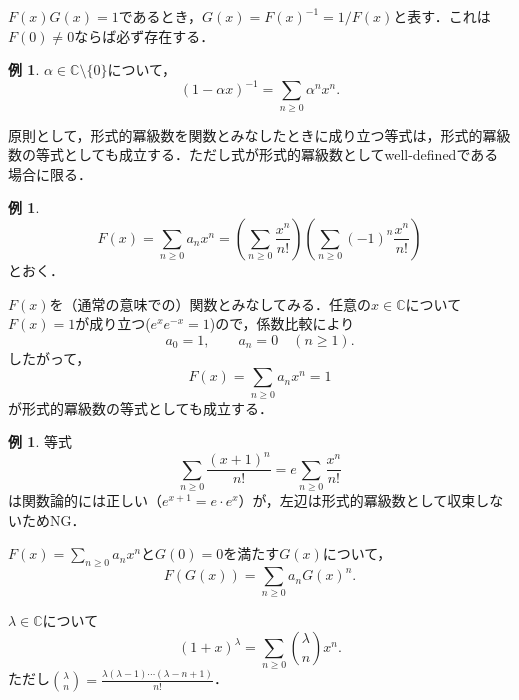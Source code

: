 \documentclass[xelatex,ja=standard,a4paper,14pt,everyparhook=compat]{bxjsarticle}
\newcommand{\paren}[1]{\left(#1\right)}
\newcommand{\bbC}{\mathbb{C}}
\theoremstyle{definition}
\newtheorem{example}[theorem]{例}
\begin{document}
$F(x) G(x) = 1$であるとき，$G(x) = F(x)^{-1} = 1/F(x)$と表す．これは$F(0) \neq 0$ならば必ず存在する．

\setcounter{section}{1}
\setcounter{subsection}{1}
\setcounter{theorem}{4}
\begin{example}
    $\alpha \in \bbC \setminus \{0\}$について，
    \begin{equation*}
        (1-\alpha x)^{-1} = \sum_{n \geq 0} \alpha^n x^n.
    \end{equation*}
\end{example}

原則として，形式的冪級数を関数とみなしたときに成り立つ等式は，形式的冪級数の等式としても成立する．ただし式が形式的冪級数としてwell-definedである場合に限る．

\begin{example}
    \begin{equation*}
        F(x) = \sum_{n \geq 0} a_n x^n = \paren{\sum_{n \geq 0} \frac{x^n}{n!}} \paren{\sum_{n \geq 0} (-1)^n \frac{x^n}{n!}}
    \end{equation*}
    とおく．

    $F(x)$を（通常の意味での）関数とみなしてみる．任意の$x \in \bbC$について$F(x) = 1$が成り立つ($e^x e^{-x} = 1$)ので，係数比較により \begin{equation*}
        a_0 = 1, \qquad a_n = 0 \quad (n \geq 1).
    \end{equation*}
    したがって， \begin{equation*}
        F(x) = \sum_{n \geq 0} a_n x^n = 1
    \end{equation*}
    が形式的冪級数の等式としても成立する．
\end{example}

\begin{example}
    等式 \begin{equation*}
        \sum_{n \geq 0} \frac{(x+1)^n}{n!} = e \sum_{n \geq 0} \frac{x^n}{n!}
    \end{equation*}
    は関数論的には正しい（$e^{x+1} = e \cdot e^x$）が，左辺は形式的冪級数として収束しないためNG．
\end{example}

$F(x) = \sum_{n \geq 0} a_n x^n$と$G(0) = 0$を満たす$G(x)$について， \begin{equation*}
    F(G(x)) = \sum_{n \geq 0} a_n G(x)^n.
\end{equation*}

$\lambda \in \bbC$について \begin{equation*}
    (1 + x)^\lambda = \sum_{n \geq 0} \binom{\lambda}{n} x^n.
\end{equation*}
ただし$\binom{\lambda}{n} = \frac{\lambda(\lambda-1)\cdots(\lambda-n+1)}{n!}$．
\end{document}
